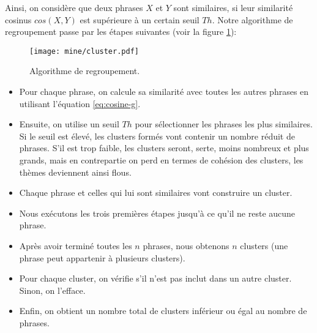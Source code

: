 \documentclass[a4paper,12pt,oneside]{../use/ESIthesis}
\begin{document}
Ainsi, on considère que deux phrases $ X $ et $ Y $ sont similaires, si leur similarité cosinus $ cos(X,Y) $ est supérieure à un certain seuil $ Th $.
Notre algorithme de regroupement passe par les étapes suivantes (voir la figure \ref{fig:cluster}):
\begin{figure}[ht]
\begin{center}
\texttt{[image: mine/cluster.pdf]}
\caption{Algorithme de regroupement.}
\label{fig:cluster}
\end{center}
\end{figure}
\begin{itemize}
\item Pour chaque phrase, on calcule sa similarité avec toutes les autres phrases en utilisant l'équation \ref{eq:cosine-g}.

\item Ensuite, on utilise un seuil $ Th $ pour sélectionner les phrases les plus similaires. 
Si le seuil est élevé, les clusters formés vont contenir un nombre réduit de phrases. 
S'il est trop faible, les clusters seront, serte, moins nombreux et plus grands, mais en contrepartie on perd en termes de cohésion des clusters, les thèmes deviennent ainsi flous. %

\item Chaque phrase et celles qui lui sont similaires vont construire un cluster. 

\item Nous exécutons les trois premières étapes jusqu'à ce qu'il ne reste aucune phrase. 

\item Après avoir terminé toutes les $ n $ phrases, nous obtenons $ n $ clusters (une phrase peut appartenir à plusieurs clusters). 

\item Pour chaque cluster, on vérifie s'il n'est pas inclut dans un autre cluster. Sinon, on l'efface. 

\item Enfin, on obtient un nombre total de clusters inférieur ou égal au nombre de phrases.

\end{itemize}
\end{document}
